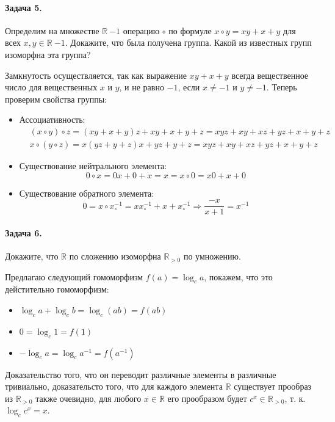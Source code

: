 \documentclass[a4paper,12pt]{article}
\begin{document}
\paragraph{Задача 5.} Определим на множестве $\mathbb{R} \ {-1}$ операцию $\circ$ по формуле $x \circ y = xy + x + y$ для всех $x,y \in \mathbb{R} \ {-1}$. Докажите, что была получена группа. Какой из известных групп изоморфна эта группа?
\begin{Solution}
Замкнутость осуществляется, так как выражение $xy+x+y$ всегда вещественное число для вещественных $x$ и $y$, и не равно $-1$, если $x \not= -1$ и $y \not= -1$. Теперь проверим свойства группы:
\begin{itemize}
\item Ассоциативность:
\[
	\begin{split}
		& \left(x \circ y\right) \circ z = \left(xy + x + y\right)z + xy + x + y + z = xyz + xy + xz + yz + x + y + z \\
		& x \circ \left(y \circ z \right) = x \left(yz + y + z\right) x + yz + y + z = xyz + xy + xz + yz + x + y + z
	\end{split}
\]

\item Существование нейтрального элемента:
\[
	0 \circ x = 0x + 0 + x = x = x \circ 0 = x0 + x + 0
\]

\item Существование обратного элемента:
\[
	0 = x \circ x^{-1}_{\circ} = xx^{-1}_{\circ} + x + x^{-1}_{\circ} \Rightarrow \frac{-x}{x+1} = x^{-1}
\]
\end{itemize}
\end{Solution}

\paragraph{Задача 6.} Докажите, что $\mathbb{R}$ по сложению изоморфна $\mathbb{R}_{>0}$ по умножению.

\begin{Solution}
Предлагаю следующий гомоморфизм $f\left(a\right) = \log_c a$, покажем, что это дейстительно гомоморфизм:
\begin{itemize}
\item $\log_c a + \log_c b = \log_c \left(ab\right) = f\left(ab\right)$

\item $0 = \log_c 1 = f\left(1\right)$

\item $-\log_c a = \log_c a^{-1} = f\left(a^{-1}\right)$
\end{itemize}

Доказательство того, что он переводит различные элементы в различные тривиально, доказательсто того, что для каждого элемента $\mathbb{R}$ существует прообраз из $\mathbb{R}_{>0}$ также очевидно, для любого $x \in \mathbb{R}$ его прообразом будет $c^x \in \mathbb{R}_{>0}$, т. к. $\log_c c^x = x$. 
\end{Solution}
\end{document}
